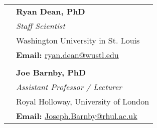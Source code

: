 \documentclass{article}
\begin{document}
\begin{longtable}{r | p{13cm}}
											& \large\textbf{Ryan Dean, PhD} \\
											& \textit{Staff Scientist} \\
											& Washington University in St. Louis \\
											& \textbf{Email:} \href{mailto:ryan.dean@wustl.edu}{ryan.dean@wustl.edu} \\
											& \\

											& \large\textbf{Joe Barnby, PhD} \\
											& \textit{Assistant Professor / Lecturer} \\
											& Royal Holloway, University of London \\
											& \textbf{Email:} \href{mailto:Joseph.Barnby@rhul.ac.uk}{Joseph.Barnby@rhul.ac.uk} \\
	\end{longtable}
\end{document}
